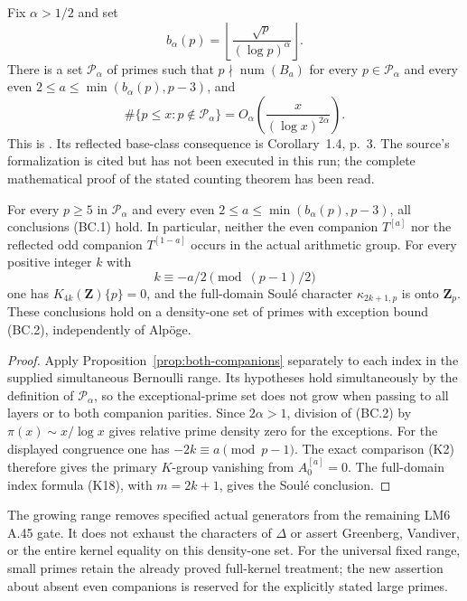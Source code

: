 \begin{sourcefact}
\label{source:partial-regularity}
Fix $\alpha>1/2$ and set
\[
                  b_\alpha(p)=
                  \left\lfloor\frac{\sqrt p}{(\log p)^\alpha}\right\rfloor.
\]
There is a set $\mathcal P_\alpha$ of primes such that
$p\nmid\operatorname{num}(B_a)$ for every $p\in\mathcal P_\alpha$
and every even $2\leq a\leq\min(b_\alpha(p),p-3)$, and
\[
 \#\{p\leq x:p\notin\mathcal P_\alpha\}
          =O_\alpha\!\left(\frac{x}{(\log x)^{2\alpha}}\right).
 \tag{BC.2}
\]
This is \cite[Theorem~1.1, p.~2; full proof in \S3,
pp.~9--10, using \S2, pp.~6--8]{ChenEtAl2026}.
Its reflected base-class consequence is Corollary~1.4, p.~3.
The source's formalization is cited but has not been executed
in this run; the complete mathematical proof of the stated
counting theorem has been read.
\end{sourcefact}

\begin{corollary}
\label{cor:growing-component-window}
For every $p\geq5$ in $\mathcal P_\alpha$ and every even
$2\leq a\leq\min(b_\alpha(p),p-3)$, all conclusions (BC.1)
hold. In particular, neither the even companion $T^{[a]}$
nor the reflected odd companion $T^{[1-a]}$ occurs in the
actual arithmetic group. For every positive integer $k$ with
\[
                     k\equiv-a/2\pmod{(p-1)/2}
\]
one has $K_{4k}(\mathbf Z)\{p\}=0$, and the full-domain
Soul\'e character $\kappa_{2k+1,p}$ is onto $\mathbf Z_p$.
These conclusions hold on a density-one set of primes with
exception bound (BC.2), independently of Alp\"oge.
\end{corollary}

\begin{proof}
Apply Proposition~\ref{prop:both-companions} separately to each
index in the supplied simultaneous Bernoulli range. Its hypotheses
hold simultaneously by the definition of $\mathcal P_\alpha$,
so the exceptional-prime set does not grow when passing to all
layers or to both companion parities. Since $2\alpha>1$,
division of (BC.2) by $\pi(x)\sim x/\log x$ gives relative
prime density zero for the exceptions.
For the displayed congruence one has $-2k\equiv a\pmod{p-1}$.
The exact comparison (K2) therefore gives the primary $K$-group
vanishing from $A_0^{[a]}=0$. The full-domain index formula
(K18), with $m=2k+1$, gives the Soul\'e conclusion.
\end{proof}

The growing range removes specified actual generators from the
remaining LM6 A.45 gate. It does not exhaust the characters of
$\Delta$ or assert Greenberg, Vandiver, or the entire kernel
equality on this density-one set. For the universal fixed range,
small primes retain the already proved full-kernel treatment;
the new assertion about absent even companions is reserved for
the explicitly stated large primes.
